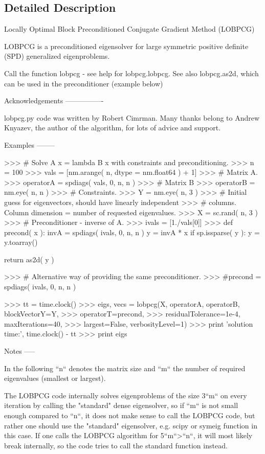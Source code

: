 \subsection{Detailed Description}
\begin{DoxyVerb}Locally Optimal Block Preconditioned Conjugate Gradient Method (LOBPCG)

LOBPCG is a preconditioned eigensolver for large symmetric positive definite
(SPD) generalized eigenproblems.

Call the function lobpcg - see help for lobpcg.lobpcg. See also lobpcg.as2d,
which can be used in the preconditioner (example below)

Acknowledgements
----------------

lobpcg.py code was written by Robert Cimrman. Many thanks belong to Andrew
Knyazev, the author of the algorithm, for lots of advice and support.


Examples
--------

>>> # Solve A x = lambda B x with constraints and preconditioning.
>>> n = 100
>>> vals = [nm.arange( n, dtype = nm.float64 ) + 1]
>>> # Matrix A.
>>> operatorA = spdiags( vals, 0, n, n )
>>> # Matrix B
>>> operatorB = nm.eye( n, n )
>>> # Constraints.
>>> Y = nm.eye( n, 3 )
>>> # Initial guess for eigenvectors, should have linearly independent
>>> # columns. Column dimension = number of requested eigenvalues.
>>> X = sc.rand( n, 3 )
>>> # Preconditioner - inverse of A.
>>> ivals = [1./vals[0]]
>>> def precond( x ):
    invA = spdiags( ivals, 0, n, n )
    y = invA  * x
    if sp.issparse( y ):
y = y.toarray()

    return as2d( y )

>>> # Alternative way of providing the same preconditioner.
>>> #precond = spdiags( ivals, 0, n, n )

>>> tt = time.clock()
>>> eigs, vecs = lobpcg(X, operatorA, operatorB, blockVectorY=Y,
>>>                     operatorT=precond,
>>>                     residualTolerance=1e-4, maxIterations=40,
>>>                     largest=False, verbosityLevel=1)
>>> print 'solution time:', time.clock() - tt
>>> print eigs


Notes
-----

In the following ``n`` denotes the matrix size and ``m`` the number
of required eigenvalues (smallest or largest).

The LOBPCG code internally solves eigenproblems of the size 3``m`` on every
iteration by calling the "standard" dense eigensolver, so if ``m`` is not
small enough compared to ``n``, it does not make sense to call the LOBPCG
code, but rather one should use the "standard" eigensolver, e.g. scipy or symeig
function in this case. If one calls the LOBPCG algorithm for 5``m``>``n``,
it will most likely break internally, so the code tries to call the standard
function instead.


\end{DoxyVerb}
